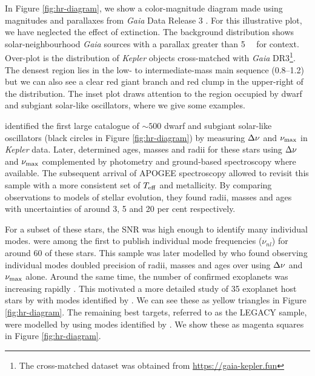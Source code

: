 In Figure \ref{fig:hr-diagram}, we show a color-magnitude diagram made using magnitudes and parallaxes from \emph{Gaia} Data Release 3 \citep[DR3;][]{GaiaCollaboration.Vallenari.ea2022}. For this illustrative plot, we have neglected the effect of extinction. The background distribution shows solar-neighbourhood \emph{Gaia} sources with a parallax greater than \SI{5}{\milli\aarcsec} for context. Over-plot is the distribution of \emph{Kepler} objects cross-matched with \emph{Gaia} DR3\footnote{The cross-matched dataset was obtained from \url{https://gaia-kepler.fun}}. The densest region lies in the low- to intermediate-mass main sequence (\SIrange{0.8}{1.2}{\solarmass}) but we can also see a clear red giant branch and red clump in the upper-right of the distribution. The inset plot draws attention to the region occupied by dwarf and subgiant solar-like oscillators, where we give some examples.

\citet{Chaplin.Kjeldsen.ea2011} identified the first large catalogue of \(\sim 500\) dwarf and subgiant solar-like oscillators (black circles in Figure \ref{fig:hr-diagram}) by measuring \({\Delta\nu}\) and \({\nu_\mathrm{max}}\) in \emph{Kepler} data. Later, \citet{Chaplin.Basu.ea2014} determined ages, masses and radii for these stars using \({\Delta\nu}\) and \({\nu_\mathrm{max}}\) complemented by photometry and ground-based spectroscopy where available. The subsequent arrival of APOGEE spectroscopy allowed \citet{Serenelli.Johnson.ea2017} to revisit this sample with a more consistent set of \({T_\mathrm{eff}}\) and metallicity. By comparing observations to models of stellar evolution, they found radii, masses and ages with uncertainties of around 3, 5 and 20 per cent respectively.

For a subset of these stars, the SNR was high enough to identify many individual modes. \citet{Appourchaux.Chaplin.ea2012} were among the first to publish individual mode frequencies (\(\nu_{nl}\)) for around 60 of these stars. This sample was later modelled by \citet{Metcalfe.Creevey.ea2014} who found observing individual modes doubled precision of radii, masses and ages over using \({\Delta\nu}\) and \({\nu_\mathrm{max}}\) alone. Around the same time, the number of confirmed exoplanets was increasing rapidly \citep{Burke.Bryson.ea2014}. This motivated a more detailed study of 35 exoplanet host stars by \citet{SilvaAguirre.Davies.ea2015} with modes identified by \citet{Davies.SilvaAguirre.ea2016}. We can see these as yellow triangles in Figure \ref{fig:hr-diagram}. The remaining best targets, referred to as the LEGACY sample, were modelled by \citet{SilvaAguirre.Lund.ea2017} using modes identified by \citet{Lund.SilvaAguirre.ea2017}. We show these as magenta squares in Figure \ref{fig:hr-diagram}.


